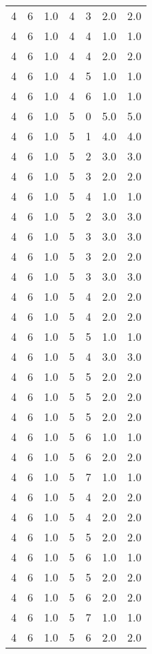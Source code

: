 \documentclass[a4paper,12pt]{article}
\begin{document}
\begin{center}
\begin{longtable}{ c c c | c c c | c }
        4 & 6 & 1.0 & 4 & 3 & 2.0 & 2.0 \\
        4 & 6 & 1.0 & 4 & 4 & 1.0 & 1.0 \\
        4 & 6 & 1.0 & 4 & 4 & 2.0 & 2.0 \\
        4 & 6 & 1.0 & 4 & 5 & 1.0 & 1.0 \\
        4 & 6 & 1.0 & 4 & 6 & 1.0 & 1.0 \\
        4 & 6 & 1.0 & 5 & 0 & 5.0 & 5.0 \\
        4 & 6 & 1.0 & 5 & 1 & 4.0 & 4.0 \\
        4 & 6 & 1.0 & 5 & 2 & 3.0 & 3.0 \\
        4 & 6 & 1.0 & 5 & 3 & 2.0 & 2.0 \\
        4 & 6 & 1.0 & 5 & 4 & 1.0 & 1.0 \\
        4 & 6 & 1.0 & 5 & 2 & 3.0 & 3.0 \\
        4 & 6 & 1.0 & 5 & 3 & 3.0 & 3.0 \\
        4 & 6 & 1.0 & 5 & 3 & 2.0 & 2.0 \\
        4 & 6 & 1.0 & 5 & 3 & 3.0 & 3.0 \\
        4 & 6 & 1.0 & 5 & 4 & 2.0 & 2.0 \\
        4 & 6 & 1.0 & 5 & 4 & 2.0 & 2.0 \\
        4 & 6 & 1.0 & 5 & 5 & 1.0 & 1.0 \\
        4 & 6 & 1.0 & 5 & 4 & 3.0 & 3.0 \\
        4 & 6 & 1.0 & 5 & 5 & 2.0 & 2.0 \\
        4 & 6 & 1.0 & 5 & 5 & 2.0 & 2.0 \\
        4 & 6 & 1.0 & 5 & 5 & 2.0 & 2.0 \\
        4 & 6 & 1.0 & 5 & 6 & 1.0 & 1.0 \\
        4 & 6 & 1.0 & 5 & 6 & 2.0 & 2.0 \\
        4 & 6 & 1.0 & 5 & 7 & 1.0 & 1.0 \\
        4 & 6 & 1.0 & 5 & 4 & 2.0 & 2.0 \\
        4 & 6 & 1.0 & 5 & 4 & 2.0 & 2.0 \\
        4 & 6 & 1.0 & 5 & 5 & 2.0 & 2.0 \\
        4 & 6 & 1.0 & 5 & 6 & 1.0 & 1.0 \\
        4 & 6 & 1.0 & 5 & 5 & 2.0 & 2.0 \\
        4 & 6 & 1.0 & 5 & 6 & 2.0 & 2.0 \\
        4 & 6 & 1.0 & 5 & 7 & 1.0 & 1.0 \\
        4 & 6 & 1.0 & 5 & 6 & 2.0 & 2.0 \\

\end{longtable}
\end{center}
\end{document}
